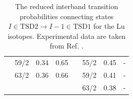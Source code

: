 \begin{table}
\begin{tabular}{|cccc|clc|cc|}
    \multicolumn{1}{|c|}{} & \multicolumn{1}{c|}{59/2} & \multicolumn{1}{c|}{0.34} & 0.65 & \multicolumn{2}{c|}{} & 55/2 & \multicolumn{1}{c|}{0.45} & - \\ \cline{2-4} \cline{7-9} 
    \multicolumn{1}{|c|}{} & \multicolumn{1}{c|}{63/2} & \multicolumn{1}{c|}{0.36} & 0.66 & \multicolumn{2}{c|}{} & 59/2 & \multicolumn{1}{c|}{0.41} & - \\ \cline{1-4} \cline{7-9} 
    \multicolumn{4}{|c|}{} & \multicolumn{2}{c|}{} & 63/2 & \multicolumn{1}{c|}{0.38} & - \\ \hline
    \end{tabular}
    \caption{The reduced interband transition probabilities connecting states $I\in\text{TSD2}\to I-1\in\text{TSD1}$ for the Lu isotopes. Experimental data are taken from Ref. \cite{reich2010nuclear}.}
    \label{table-interband-E2-numerical-results}
\end{table}
